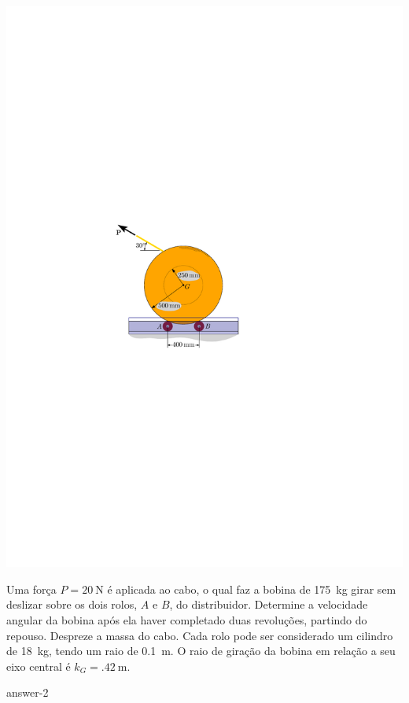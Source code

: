 \begin{minipage}{.6\linewidth}
	\vspace{2.5cm}
	\begin{flushleft}
		\includegraphics[scale=1.2]{../../images/draw_1_1}
	\end{flushleft}
\end{minipage}
\begin{minipage}{.4\linewidth}
	\item Uma força $P=\SI{20}{\newton}$ é aplicada ao cabo, o qual faz a bobina de \SI{175}{\kilogram} girar sem deslizar sobre os dois rolos, $A$ e $B$, do distribuidor. Determine a velocidade angular da bobina após ela haver completado duas revoluções, partindo do repouso. Despreze a massa do cabo. Cada rolo pode ser considerado um cilindro de \SI{18}{\kilogram}, tendo um raio de \SI{.1}{\meter}. O raio de giração da bobina em relação a seu eixo central é $k_{G}=\SI{.42}{\meter}$.
	
	{answer-2}
\end{minipage}